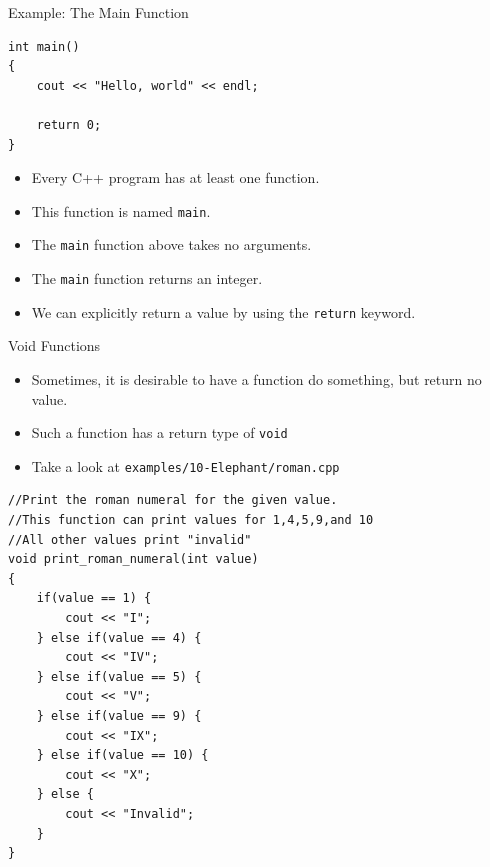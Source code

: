 \documentclass[]{beamer}
\begin{document}
\begin{frame}[fragile]{Example: The Main Function}
    \begin{verbatim}
int main()
{
    cout << "Hello, world" << endl;

    return 0;
}
    \end{verbatim}
    \begin{itemize}[<+->]
        \item Every C++ program has at least one function.
        \item This function is named \texttt{main}.
        \item The \texttt{main} function above takes no arguments.
        \item The \texttt{main} function returns an integer.
        \item We can explicitly return a value by using the
            \texttt{return} keyword.
    \end{itemize}
\end{frame}

\begin{frame}[fragile]{Void Functions}
    \begin{itemize}[<+->]
        \item Sometimes, it is desirable to have a function do
            something, but return no value. 
        \item Such a function has a return type of \texttt{void}
        \item Take a look at \texttt{examples/10-Elephant/roman.cpp}
    \end{itemize}
    \pause
    \begin{adjustbox}{max width=0.9\textwidth, max totalheight=0.63\textheight}
    \begin{BVerbatim}
//Print the roman numeral for the given value.
//This function can print values for 1,4,5,9,and 10
//All other values print "invalid"
void print_roman_numeral(int value) 
{
    if(value == 1) {
        cout << "I";
    } else if(value == 4) {
        cout << "IV";
    } else if(value == 5) {
        cout << "V";
    } else if(value == 9) {
        cout << "IX";
    } else if(value == 10) {
        cout << "X";
    } else {
        cout << "Invalid";
    }
}
    \end{BVerbatim}
    \end{adjustbox}
\end{frame}
\end{document}
